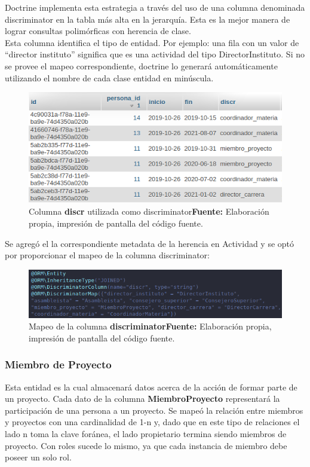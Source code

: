 Doctrine implementa esta estrategia a través del uso de una columna denominada discriminator en la tabla más alta en la jerarquía\@. Esta es la mejor
manera de lograr consultas polimórficas con herencia de clase\@. \textcite{doctrine-inheritance}\\
\noindent
Esta columna identifica el tipo de entidad. Por ejemplo: una
fila con un valor de ``director instituto'' significa que es una actividad del tipo DirectorInstituto\@.
Si no se provee el mapeo correspondiente, doctrine lo generará automáticamente utilizando el nombre de cada clase entidad en minúscula\@. \textcite{doctrine-inheritance}

\begin{figure}[h]
    \includegraphics[width=1\linewidth]{image/discriminator-doctrine.png}
    \caption{Columna \textbf{discr} utilizada como discriminator\newline \textbf{Fuente:} Elaboración propia, impresión de pantalla del código fuente.}
    \label{fig:image/discriminator-doctrine.png}
\end{figure}
\newpage
Se agregó el la correspondiente metadata de la herencia en Actividad y se optó por proporcionar el mapeo de la columna discriminator:

\begin{figure}[h]
    \includegraphics[width=1\linewidth]{image/discr.png}
    \caption{Mapeo de la columna \textbf{discriminator}\newline \textbf{Fuente:} Elaboración propia, impresión de pantalla del código fuente.}
    \label{fig:image/discr.png}
\end{figure}

\subsubsection{Miembro de Proyecto}%
\label{ssub:miembro_de_proyecto_modelo}
Esta entidad es la cual almacenará datos acerca de la acción de formar parte de un proyecto. Cada dato de la columna \textbf{MiembroProyecto} representará la participación
de una persona a un proyecto\@.
Se mapeó la relación entre miembros y proyectos con una cardinalidad de 1-n y, dado que en este tipo de relaciones el lado n toma la clave foránea, el lado propietario termina siendo miembros de proyecto\@.
Con roles sucede lo mismo, ya que cada instancia de miembro debe poseer un solo rol.

